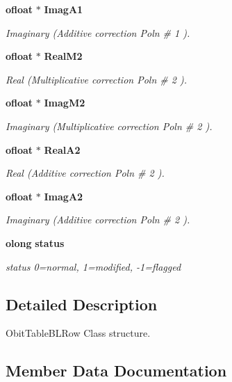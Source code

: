 \begin{CompactItemize}
{\bf ofloat} $\ast$ {\bf Imag\-A1}
\begin{CompactList}\small\item\em Imaginary (Additive correction Poln \# 1 ). \item\end{CompactList}\item 
{\bf ofloat} $\ast$ {\bf Real\-M2}
\begin{CompactList}\small\item\em Real (Multiplicative correction Poln \# 2 ). \item\end{CompactList}\item 
{\bf ofloat} $\ast$ {\bf Imag\-M2}
\begin{CompactList}\small\item\em Imaginary (Multiplicative correction Poln \# 2 ). \item\end{CompactList}\item 
{\bf ofloat} $\ast$ {\bf Real\-A2}
\begin{CompactList}\small\item\em Real (Additive correction Poln \# 2 ). \item\end{CompactList}\item 
{\bf ofloat} $\ast$ {\bf Imag\-A2}
\begin{CompactList}\small\item\em Imaginary (Additive correction Poln \# 2 ). \item\end{CompactList}\item 
{\bf olong} {\bf status}
\begin{CompactList}\small\item\em status 0=normal, 1=modified, -1=flagged \item\end{CompactList}\end{CompactItemize}


\subsection{Detailed Description}
Obit\-Table\-BLRow Class structure. 



\subsection{Member Data Documentation}
